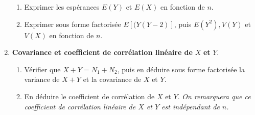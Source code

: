\begin{enumerate}
\begin{enumerate}
\item Exprimer les esp\'erances $E(Y)$ et $E(X)$ en fonction de $n$.

\item Exprimer sous forme factoris\'ee $E[(Y(Y-2)]$, puis $E(Y^{2}),V(Y)$ et $%
V(X)$ en fonction de $n$.
\end{enumerate}

\item \textbf{Covariance et coefficient de corr\'elation lin\'eaire de }$X$\textbf{ et }$Y$.

\begin{enumerate}
\item V\'erifier que $X+Y=N_{1}+N_{2}$, puis en d\'eduire sous forme factoris\'ee
la variance de $X+Y$ et la covariance de $X$ et $Y$.

\item En d\'eduire le coefficient de corr\'elation de $X$ et $Y$.\newline
\textit{On remarquera que ce coefficient de corr\'elation lin\'eaire de $X$ et $Y
$ est ind\'ependant de $n$.}
\end{enumerate}


\end{enumerate}




